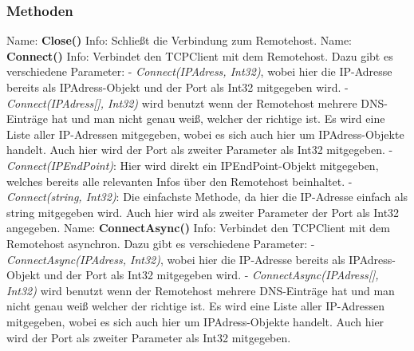 \subsubsection{Methoden}
Name: \textbf{Close()}
\newline
Info: Schließt die Verbindung zum Remotehost.
\newline
\newline
Name: \textbf{Connect()}
\newline
Info: Verbindet den TCPClient mit dem Remotehost. Dazu gibt es verschiedene Parameter:
\newline \tab \newline
- \textit{Connect(IPAdress, Int32)}, wobei hier die IP-Adresse bereits als IPAdress-Objekt und der Port als Int32 mitgegeben wird.
\newline \tab \newline
- \textit{Connect(IPAdress[], Int32)} wird benutzt wenn der Remotehost mehrere DNS-Einträge hat und man nicht genau weiß, welcher der richtige ist. Es wird eine Liste aller IP-Adressen mitgegeben, wobei es sich auch hier um IPAdress-Objekte handelt. Auch hier wird der Port als zweiter Parameter als Int32 mitgegeben.
\newline \tab \newline
- \textit{Connect(IPEndPoint)}: Hier wird direkt ein IPEndPoint-Objekt mitgegeben, welches bereits alle relevanten Infos über den Remotehost beinhaltet.
\newline \tab \newline
- \textit{Connect(string, Int32)}: Die einfachste Methode, da hier die IP-Adresse einfach als string mitgegeben wird. Auch hier wird als zweiter Parameter der Port als Int32 angegeben.
\newline
\newline
Name: \textbf{ConnectAsync()}
\newline
Info: Verbindet den TCPClient mit dem Remotehost asynchron. Dazu gibt es verschiedene Parameter:
\newline \tab \newline
- \textit{ConnectAsync(IPAdress, Int32)}, wobei hier die IP-Adresse bereits als IPAdress-Objekt und der Port als Int32 mitgegeben wird.
\newline \tab \newline
- \textit{ConnectAsync(IPAdress[], Int32)} wird benutzt wenn der Remotehost mehrere DNS-Einträge hat und man nicht genau weiß welcher der richtige ist. Es wird eine Liste aller IP-Adressen mitgegeben, wobei es sich auch hier um IPAdress-Objekte handelt. Auch hier wird der Port als zweiter Parameter als Int32 mitgegeben.
